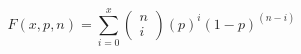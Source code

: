 

\[
F(x,p,n) = \sum_{i=0}^{x}{\left( \begin{array}{c} n \\ i \end{array} \right) (p)^{i}(1 - p)^{(n-i)}}
\]



